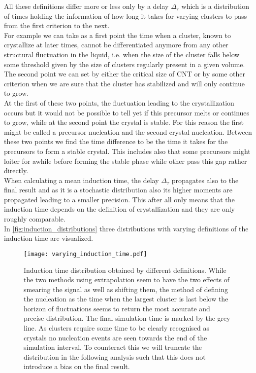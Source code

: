 All these definitions differ more or less only by a delay $\Delta_{\tau}$ which is a distribution of times holding the information of how long it takes for varying clusters to pass from the first criterion to the next.\\
For example we can take as a first point the time when a cluster, known to crystallize at later times, cannot be differentiated anymore from any other structural fluctuation in the liquid, i.e. when the size of the cluster falls below some threshold given by the size of clusters regularly present in a given volume.\\
The second point we can set by either the critical size of CNT or by some other criterion when we are sure that the cluster has stabilized and will only continue to grow.\\
At the first of these two points, the fluctuation leading to the crystallization occurs but it would not be possible to tell yet if this precursor melts or continues to grow, while at the second point the crystal is stable. For this reason the first might be called a precursor nucleation and the second crystal nucleation. Between these two points we find the time difference to be the time it takes for the precursors to form a stable crystal. This includes also that some precursors might loiter for awhile before forming the stable phase while other pass this gap rather directly.\\

When calculating a mean induction time, the delay $\Delta_{\tau}$ propagates also to the final result and as it is a stochastic distribution also its higher moments are propagated leading to a smaller precision. This after all only means that the induction time depends on the definition of crystallization and they are only roughly comparable.\\ 
In \autoref{fig:induction_distributions} three distributions with varying definitions of the induction time are visualized.

\begin{figure}[!h]
\centering
\texttt{[image: varying\_induction\_time.pdf]}
\caption[Comparison of different definitions for the induction time]{Induction time distribution obtained by different definitions. While the two methods using extrapolation seem to have the two effects of smearing the signal as well as shifting them, the method of defining the nucleation as the time when the largest cluster is last below the horizon of fluctuations seems to return the most accurate and precise distribution. The final simulation time is marked by the grey line. As clusters require some time to be clearly recognised as crystals no nucleation events are seen towards the end of the simulation interval. To counteract this we will truncate the distribution in the following analysis such that this does not introduce a bias on the final result.}
\label{fig:induction_distributions}
\end{figure}

